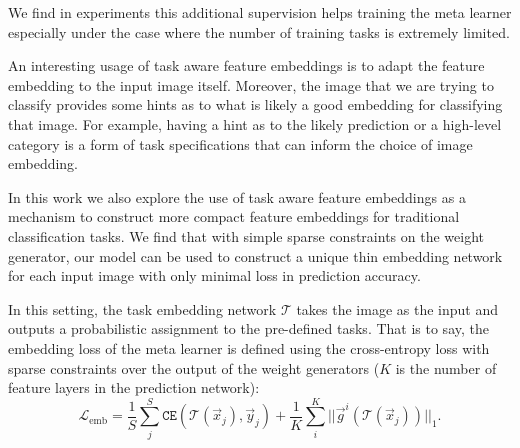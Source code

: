 \documentclass[10pt,twocolumn,letterpaper]{article}
\begin{document}
We find in experiments this additional supervision helps training the meta learner
especially under the case where the number of training tasks is extremely limited. 

An interesting usage of task aware feature embeddings is to adapt the feature embedding to the input image itself.  
Moreover, the image that we are trying to classify provides some hints as to what is likely a good embedding for classifying that image.
For example, having a hint as to the likely prediction or a high-level category is a form of task specifications that can inform the choice of image embedding.


In this work we also explore the use of task aware feature embeddings as a mechanism to construct more compact feature embeddings for traditional classification tasks.
We find that with simple sparse constraints on the weight generator, our model can be used to construct a unique thin embedding network for each input image with only minimal loss in prediction accuracy.

In this setting, the task embedding network $\mathcal{T}$ takes the image as the input and outputs a probabilistic assignment to the pre-defined tasks. 
That is to say, the embedding loss of the meta learner is defined using the cross-entropy loss with sparse constraints over the output of the weight generators ($K$ is the number of feature layers in the prediction network):
\begin{equation}
    \mathcal{L}_\text{emb} = \frac{1}{S}\sum_j^S \texttt{CE}(\mathcal{T}(\Vec{x}_j), \Vec{y}_j) + \frac{1}{K}\sum_i^K||\Vec{g}^i(\mathcal{T}(\Vec{x}_j))||_1.
    \label{eq:ef_emb}
\end{equation}
\end{document}
